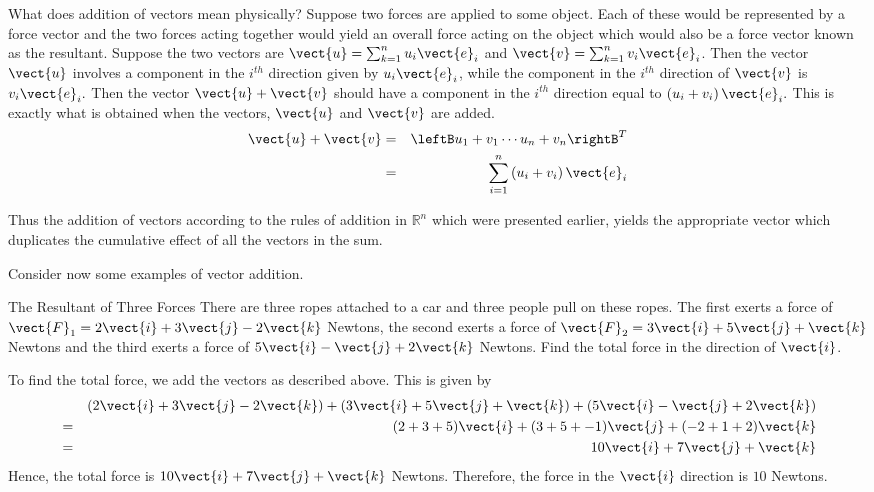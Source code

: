 What does addition of vectors mean physically? Suppose two forces are
applied to some object. Each of these would be represented by a force vector
and the two forces acting together would yield an overall force acting on
the object which would also be a force vector known as the
 resultant. Suppose the two vectors are $\vect{u}=\sum_{k=1}^{n}u_{i}\vect{e}_{i}$ and $\vect{v}=\sum_{k=1}^{n}v_{i}\vect{e}_{i}$. Then the vector $\vect{u}$ involves a component in the $
i^{th}$ direction given by $u_{i}\vect{e}_{i}$, while the component in the $i^{th}$
direction of $\vect{v}$ is $v_{i}\vect{e}_{i}.$ Then the vector $\vect{u} + \vect{v}$ should have a component in the $i^{th}$
direction equal to $\left( u_{i}+v_{i}\right) \vect{e}_{i}.$ This is
exactly what is obtained when the vectors, $\vect{u}$ and $\vect{v}$ are
added.
\begin{eqnarray*}
\vect{u}+\vect{v}& =&\leftB u_{1}+v_{1} \cdots u_{n}+v_{n}\rightB^T  \\
& =&\sum_{i=1}^{n}\left( u_{i}+v_{i}\right) \vect{e}_{i}
\end{eqnarray*}

Thus the addition of vectors according to the rules of addition in $\mathbb{R
}^{n}$ which were presented earlier, yields the appropriate vector which
duplicates the cumulative effect of all the vectors in the sum.

Consider now some examples of vector addition.

\begin{example}{The Resultant of Three Forces}\label{exa:resultantthreeforces}
There are three ropes attached to a car and three people pull on these
ropes. The first exerts a force of $\vect{F}_1 = 
2\vect{i} + 3\vect{j} -2 \vect{k}$ Newtons, the second exerts a force of $\vect{F}_2
=
3\vect{i}+5\vect{j}+\vect{k}$ Newtons
and the third exerts a force of $5\vect{i}-\vect{j}+2\vect{k}$ Newtons. Find
the total force in the direction of $\vect{i}$.
\end{example}

\begin{solution}
To find the total force, we add the vectors as described above. 
This is given by 
\begin{eqnarray*}
&&(2\vect{i}+3\vect{j}-2\vect{k}) + (3\vect{i}+5\vect{j}+\vect{k}) + (5\vect{i}-\vect{j}+2\vect{k})\\
&=&
(2  + 3 + 5) \vect{i} + (3 + 5 + -1) \vect{j} + (-2+1+2) \vect{k} \\
&=&
10 \vect{i} + 7 \vect{j} + \vect{k}
\end{eqnarray*}
Hence, the total force is  $10\vect{i}+7\vect{j}+\vect{k}$ Newtons. Therefore, the force in the $
\vect{i}$ direction is $10$ Newtons.
\end{solution}

